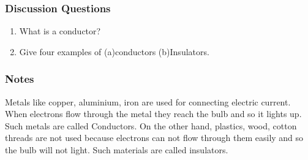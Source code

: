 \subsubsection*{Discussion Questions}
\begin{enumerate}
\item{What is a conductor?}
\item{Give four examples of (a)conductors (b)Insulators.} 
\end{enumerate}

\subsubsection*{Notes}
Metals like copper, aluminium, iron are used for connecting electric current. When electrons flow through the metal they reach the bulb and so it lights up. Such metals are called Conductors. On the other hand, plastics, wood, cotton threads are not used because electrons can not flow through them easily and so the bulb will not light. Such materials are called insulators. 


